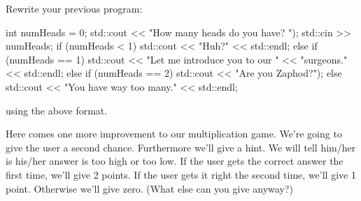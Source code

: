 \begin{ex}
Rewrite your previous program:
\begin{console}

int numHeads = 0;
std::cout << "How many heads do you have? ");
std::cin >> numHeads;
if (numHeads < 1)
{
   std::cout << "Huh?" << std::endl;
}
else
{
   if (numHeads == 1)
   {
      std::cout << "Let me introduce you to our "
                << "surgeons." << std::endl;
   }
   else
   {
        if (numHeads == 2)
        {
            std::cout << "Are you Zaphod?");
        }
        else
        {
            std::cout << "You have way too many."
                      << std::endl;
        }
   }
}
\end{console}
using the above format.
\end{ex}

\newpage{}

Here comes one more improvement to our multiplication game. We're going to give the user a second chance. Furthermore we'll give a hint. We will tell him/her is his/her answer is too high or too low. If the user gets the correct answer the first time, we'll give 2 points. If the user gets it right the second time, we'll give 1 point. Otherwise we'll give zero. (What else can you give anyway?)

